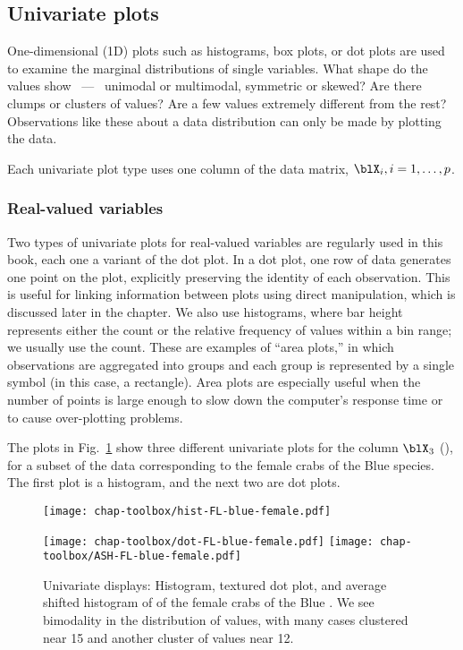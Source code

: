 \subsection{Univariate plots}

One-dimensional (1D) plots such as histograms, box plots, or dot plots are
used to examine the marginal distributions of single variables. What
shape do the values show ~---~ unimodal or multimodal, symmetric or
skewed?  Are there clumps or clusters of values? Are a few values
extremely different from the rest?  Observations like these about a
data distribution can only be made by plotting the data.

Each univariate plot type uses one column of the data matrix,
$\blX_i, i=1, \dots, p$. 

\subsubsection{Real-valued variables}

Two types of univariate plots for real-valued variables 
are regularly used in this book, each one a variant of the dot plot.
In a dot plot, one row of data generates one point on the plot,
explicitly preserving the identity of each observation.  This is
useful for linking information between plots using direct
manipulation, which is discussed later in the chapter.  We also use
histograms, where bar height represents either the count or the relative
frequency of values within a bin range; we usually use the count.
These are examples of ``area plots,'' in which observations are
aggregated into groups and each group is represented by a single
symbol (in this case, a rectangle).  Area plots are especially useful
when the number of points is large enough to slow down the computer's
response time or to cause over-plotting problems.

The plots in Fig.~\ref{dotfig} show three different univariate plots
for the column $\blX_3$ (), for a subset of the data
corresponding to the female crabs of the Blue species.  The
first plot is a histogram, and the next two are dot plots.


\begin{figure}[htp]
\centering
\centerline{
 \texttt{[image: chap-toolbox/hist-FL-blue-female.pdf]}
}
\centerline{
 \texttt{[image: chap-toolbox/dot-FL-blue-female.pdf]}
 \texttt{[image: chap-toolbox/ASH-FL-blue-female.pdf]}
}
\caption[Univariate displays]{Univariate displays: Histogram, textured
dot plot, and average shifted histogram of  of the
female crabs of the Blue .  We see bimodality in the
distribution of values, with many cases clustered near 15 and another
cluster of values near 12.}
\label{dotfig}
\end{figure}

